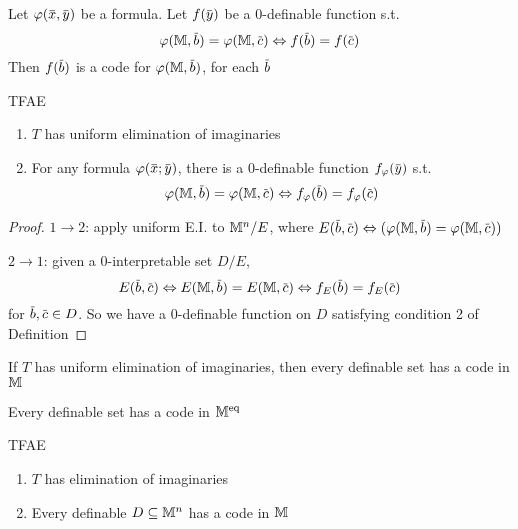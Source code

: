\documentclass[11pt]{article}
\begin{document}
\begin{lemma}[]
Let \(\varphi(\barx,\bary)\) be a formula. Let \(f(\bary)\) be a 0-definable function s.t.
\begin{equation*}
\varphi(\M,\barb)=\varphi(\M,\barc)\Leftrightarrow f(\barb)=f(\barc)
\end{equation*}
Then \(f(\barb)\) is a code for \(\varphi(\M,\barb)\), for each \(\barb\)
\end{lemma}

\begin{proposition}[]
\label{4.7.34}
TFAE
\begin{enumerate}
\item \(T\) has uniform elimination of imaginaries
\item For any formula \(\varphi(\barx;\bary)\), there is a 0-definable function \(f_\varphi(\bary)\) s.t.
\begin{equation*}
\varphi(\M,\barb)=\varphi(\M,\barc)\Leftrightarrow f_\varphi(\barb)=f_\varphi(\barc)
\end{equation*}
\end{enumerate}
\end{proposition}

\begin{proof}
\(1\to 2\): apply uniform E.I. to \(\mathbb{M}^n/E\), where \(E(\barb,\barc)\Leftrightarrow(\varphi(\M,\barb)=\varphi(\M,\barc))\)

\(2\to 1\): given a 0-interpretable set \(D/E\),
\begin{equation*}
E(\barb,\barc)\Leftrightarrow E(\M,\barb)=E(\M,\barc)\Leftrightarrow f_E(\barb)=f_E(\barc)
\end{equation*}
for \(\barb,\barc\in D\). So we have a 0-definable function on \(D\) satisfying condition 2 of Definition
\end{proof}

\begin{corollary}[]
If \(T\) has uniform elimination of imaginaries, then every definable set has a code in \(\mathbb{M}\)
\end{corollary}

\begin{corollary}[]
Every definable set has a code in \(\mathbb{M}^{\operatorname{eq}}\)
\end{corollary}

\begin{proposition}[]
TFAE
\begin{enumerate}
\item \(T\) has elimination of imaginaries
\item Every definable \(D\subseteq\mathbb{M}^n\) has a code in \(\mathbb{M}\)
\end{enumerate}
\end{proposition}
\end{document}
